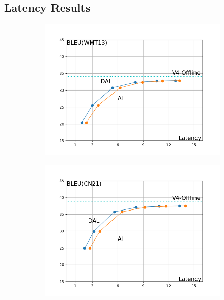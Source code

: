 \documentclass[landscape]{article}
\begin{document}
\subsection*{Latency Results}
\vspace{-7.5mm}
\begin{figure}[htp]
\begin{subfigure}{.5\textwidth}
\centering
\includegraphics[scale=0.8]{../memoria/resources/onlineres.png}
\end{subfigure}
\begin{subfigure}{.5\textwidth}
\centering
\includegraphics[scale=0.8]{../memoria/resources/onlineresCN.png}
\end{subfigure}
\end{figure}
\end{document}
